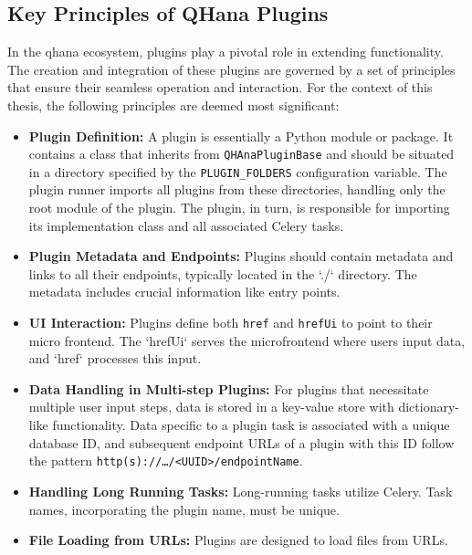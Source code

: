 \documentclass[
  a4paper,  %
  twoside,  %
  bibliography=totoc,
  headsepline,
  cleardoublepage=empty,
  parskip=half,
  draft=false
]{scrbook}
\begin{document}
\subsection{Key Principles of QHana Plugins}

In the \gls{qhana} ecosystem, plugins play a pivotal role in extending functionality.
The creation and integration of these plugins are governed by a set of principles that ensure their seamless operation and interaction.
For the context of this thesis, the following principles are deemed most significant:

\begin{itemize}
    \item \textbf{Plugin Definition:}
    A plugin is essentially a Python module or package.
    It contains a class that inherits from \texttt{QHAnaPluginBase} and should be situated in a directory specified by the \texttt{PLUGIN\_FOLDERS} configuration variable.
    The plugin runner imports all plugins from these directories, handling only the root module of the plugin.
    The plugin, in turn, is responsible for importing its implementation class and all associated Celery tasks.

    \item \textbf{Plugin Metadata and Endpoints:}
    Plugins should contain metadata and links to all their endpoints, typically located in the `./` directory.
    The metadata includes crucial information like entry points.

    \item \textbf{UI Interaction:}
    Plugins define both \texttt{href} and \texttt{hrefUi} to point to their micro frontend.
    The `hrefUi` serves the microfrontend where users input data, and `href` processes this input.

    \item \textbf{Data Handling in Multi-step Plugins:}
    For plugins that necessitate multiple user input steps, data is stored in a key-value store with dictionary-like functionality.
    Data specific to a plugin task is associated with a unique database ID, and subsequent endpoint URLs of a plugin with this ID follow the pattern \texttt{http(s)://…/<UUID>/endpointName}.

    \item \textbf{Handling Long Running Tasks:}
    Long-running tasks utilize Celery. Task names, incorporating the plugin name, must be unique.

    \item \textbf{File Loading from URLs:}
    Plugins are designed to load files from URLs.


\end{itemize}
\end{document}
